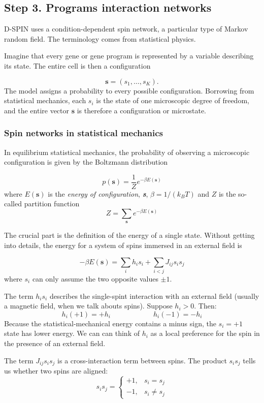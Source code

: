 \documentclass[11pt,a4paper]{article}
\begin{document}
\subsection{Step 3. Programs interaction networks}

D-SPIN uses a condition-dependent spin network, a particular type of Markov random field. The terminology comes from statistical physics.

Imagine that every gene or gene program is represented by a variable describing its state. The entire cell is then a configuration

\[
\bm{s}=(s_1,\ldots,s_K).
\]
The model assigns a probability to every possible configuration. Borrowing from statistical mechanics, each $s_i$ is the state of one microscopic degree of freedom, and the entire vector $\bm{s}$ is therefore a configuration or microstate.

\subsubsection{Spin networks in statistical mechanics}

In equilibrium statistical mechanics, the probability of observing a microscopic configuration is given by the Boltzmann distribution

\[p(\bm{s}) = \frac{1}{Z} e^{-\beta E(\bm{s})}\]
where $E(\bm{s})$ is the \textit{energy of configuration}, \textbf{\textit{s}}, $\beta = 1/(k_B T)$ and $Z$ is the so-called partition function
\[ Z = \sum_{\bm{s}} e^{-\beta E(\bm{s})}\]

The crucial part is the definition of the energy of a single state. Without getting into details, the energy for a system of spins immersed in an external field is 

\[ 
-\beta E(\bm{s}) = 
\sum_i h_i s_i
+
\sum_{i<j}J_{ij}s_is_j
 \]
where $s_i$ can only assume the two opposite values $\pm 1$.

The term $h_i s_i$ describes the single-spint interaction with an external field (usually a magnetic field, when we talk abouts spins). Suppose $h_i > 0$. Then:
\[ h_i (+1) = +h_i \qquad \qquad \qquad h_i (-1) = -h_i \]
Because the statistical-mechanical energy contains a minus sign, the $s_i = +1$ state has lower energy. We can can think of $h_i$ as a local preference for the spin in the presence of an external field.


The term $J_{ij} s_i s_j$ is a cross-interaction term between spins. The product $s_i s_j$ tells us whether two spins are aligned:
\[
s_i s_j =
\begin{cases}
+1, & s_i = s_j\\
-1, & s_i \neq s_j
\end{cases}
\]
\end{document}
